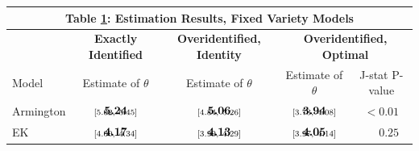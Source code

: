\documentclass[pdftex,12pt]{article}
\renewcommand{\arraystretch}{.7}
\begin{document}
\begin{table}[!h]
\footnotesize
{}
\renewcommand{\arraystretch}{1.65}
\setlength {\tabcolsep}{1.75mm}
\begin{center}\label{tb:data_rslts}
\begin{tabular}[t]{l c c c c }
\multicolumn{5}{c}{\normalsize \textbf{Table \ref{tb:data_rslts}: Estimation Results, Fixed Variety Models}}
\\
\hline
\hline
& \textbf{Exactly Identified} & \textbf{Overidentified, Identity} & \multicolumn{2}{c}{\textbf{Overidentified, Optimal}} \\
\cmidrule(r){2-2}  \cmidrule(lr){3-3} \cmidrule(lr){4-5}
Model &  Estimate of $\theta$ & Estimate of $ \theta$ & Estimate of $\theta$ & J-stat P-value \\
\hline
Armington   & $\begin{array}{c}{\textbf{5.24}} \vspace{-.4cm}\\ \scriptstyle{[5.02,   \ 5.45]}\end{array}$  & $\begin{array}{c}{\textbf{5.06}} \vspace{-.4cm}\\ \scriptstyle{[4.84,   \ 5.26]}\end{array}$ & $\begin{array}{c}{\textbf{3.94}} \vspace{-.4cm}\\ \scriptstyle{[3.73,   \ 4.08]}\end{array}$ & $< 0.01$\\
EK              & $\begin{array}{c}{\textbf{4.17}} \vspace{-.4cm}\\ \scriptstyle{[4.00,   \ 4.34]}\end{array}$  &  $\begin{array}{c}{\textbf{4.13}} \vspace{-.4cm}\\ \scriptstyle{[3.99,   \ 4.29]}\end{array}$  &  $\begin{array}{c}{\textbf{4.05}} \vspace{-.4cm}\\ \scriptstyle{[3.97,   \ 4.14]}\end{array}$  & $\phantom{<} 0.25$    \\

\end{tabular}
\end{center}
\end{table}
\end{document}
